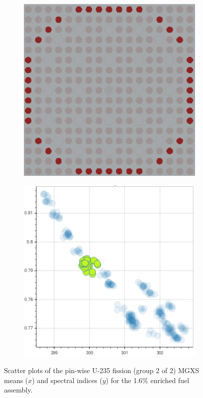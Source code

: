 \begin{figure}[h!]
\begin{subfigure}{0.45\textwidth}
  \caption{}
  \label{fig:chap10-fiss-mean-spect-ind-mgxs-2}
\end{subfigure}
\begin{subfigure}{0.45\textwidth}
  \centering
  \includegraphics[width=0.9\linewidth]{figures/unsupervised/features/assm-16/u235-fiss/mean-spect-ind-sum/geometry-3}
  \caption{}
  \label{fig:chap10-fiss-mean-spect-ind-geom-3}
\end{subfigure}%
\begin{subfigure}{0.45\textwidth}
  \centering
  \includegraphics[width=0.9\linewidth]{figures/unsupervised/features/assm-16/u235-fiss/mean-spect-ind-sum/mgxs-3}
  \caption{}
  \label{fig:chap10-fiss-mean-spect-ind-mgxs-3}
\end{subfigure}
\caption[Clustering of U-235 fission MGXS spectral indices]{Scatter plots of the pin-wise U-235 fission (group 2 of 2) \ac{MGXS} means ($x$) and spectral indices ($y$) for the 1.6\% enriched fuel assembly.}
\label{fig:chap10-fiss-mean-spect-ind}
\end{figure}

